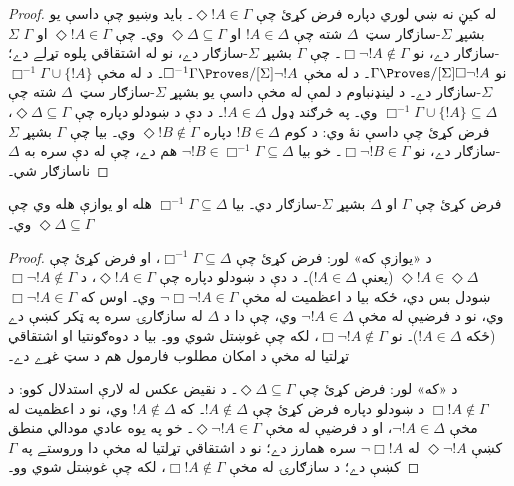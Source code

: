 \documentclass[../../../include/open-logic-section]{subfiles}
\begin{document}
{\begin{proof}
  له کيڼ نه ښي لوري دپاره فرض کړئ چې $\Diamond !A \in \Gamma$۔
  بايد وښيو چې داسې يو بشپړ $\Sigma$-سازګار سټ~$\Delta$ شته چې
  $!A \in \Delta$ او $\Diamond\Delta \subseteq \Gamma$ وي۔ چې
  $\Diamond !A \in \Gamma$ او $\Gamma$ $\Sigma$-سازګار دے، نو
  $\Box\lnot !A \notin \Gamma$۔ چې $\Gamma$ بشپړ
  $\Sigma$-سازګار دے، نو له اشتقاقي پلوه تړلے دے؛ نو
  $\Gamma \Proves/[\Sigma] \Box\lnot !A$۔ د  له
  مخې $\Box^{-1}\Gamma \Proves/[\Sigma] \lnot !A$۔ د
  له مخې $\Box^{-1}\Gamma \cup \{ !A \}$ $\Sigma$-سازګار دے۔ د
  لينډنباوم د لمې له مخې داسې يو بشپړ $\Sigma$-سازګار سټ~$\Delta$
  شته چې $\Box^{-1}\Gamma \cup \{ !A \} \subseteq \Delta$ وي۔ په
  څرګند ډول $!A \in \Delta$۔ د دې د ښودلو دپاره چې
  $\Diamond\Delta \subseteq \Gamma$، فرض کړئ چې داسې نۀ وي: د
  کوم $!B \in \Delta$ دپاره $\Diamond !B \notin \Gamma$ وي۔ بيا
  چې $\Gamma$ بشپړ $\Sigma$-سازګار دے، نو
  $\Box\lnot !B \in \Gamma$۔ خو بيا $\lnot !B \in \Box^{-1}\Gamma \subseteq
  \Delta$ هم دے، چې له دې سره به $\Delta$ ناسازګار شي۔
\end{proof}
}

\begin{lem}
  فرض کړئ چې $\Gamma$ او $\Delta$ بشپړ $\Sigma$-سازګار دي۔ بيا
  $\Box^{-1}\Gamma \subseteq \Delta$ هله او يوازې هله وي چې
  $\Diamond\Delta \subseteq \Gamma$ وي۔
\end{lem}

\begin{proof}
  د «يوازې که» لور: فرض کړئ چې $\Box^{-1}\Gamma \subseteq \Delta$،
  او فرض کړئ چې $\Diamond!A \in \Diamond\Delta$ (يعنې
  $!A \in \Delta$)۔ د دې د ښودلو دپاره چې $\Diamond!A \in \Gamma$،
  د $\Box\lnot!A \notin \Gamma$ ښودل بس دي، ځکه بيا د اعظميت له
  مخې $\lnot\Box\lnot !A \in \Gamma$ وي۔ اوس که
  $\Box\lnot!A \in \Gamma$ وي، نو د فرضيې له مخې
  $\lnot!A \in \Delta$ وي، چې دا د $\Delta$ له سازګارۍ سره په
  ټکر کښې دے (ځکه $!A \in \Delta$)۔ نو
  $\Box\lnot!A \notin \Gamma$، لکه چې غوښتل شوي وو۔
  بيا د دوه‌ګونتيا او اشتقاقي تړلتيا له مخې د امکان مطلوب
  فارمول هم د سټ غړے دے۔

  د «که» لور: فرض کړئ چې $\Diamond\Delta \subseteq \Gamma$۔ د
  نقيض عکس له لارې استدلال کوو: د $\Box!A \notin \Gamma$ د ښودلو
  دپاره فرض کړئ چې $!A \notin \Delta$۔ که $!A \notin \Delta$
  وي، نو د اعظميت له مخې $\lnot!A \in \Delta$، او د فرضيې له
  مخې $\Diamond\lnot!A \in \Gamma$۔ خو په يوه عادي مودالي
  منطق کښې $\Diamond\lnot!A$ له $\lnot\Box !A$ سره همارز دے؛
  نو د اشتقاقي تړلتيا له مخې دا وروستے په $\Gamma$ کښې دے؛
  د سازګارۍ له مخې
  $\Box!A \notin\Gamma$، لکه چې غوښتل شوي وو۔
\end{proof}
\end{document}
